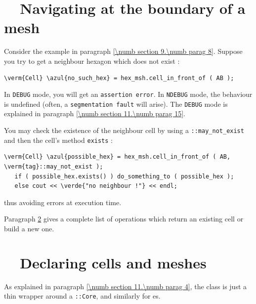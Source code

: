 \section{~~Navigating at the boundary of a mesh}\label{\numb section 9.\numb parag 9}

Consider the example in paragraph \ref{\numb section 9.\numb parag 8}.
Suppose you try to get a neighbour hexagon which does not exist :

\begin{Verbatim}[commandchars=\\\{\},formatcom=\small\tt,
   baselinestretch=0.94,framesep=2mm                      ]
   \verm{Cell} \azul{no_such_hex} = hex_msh.cell_in_front_of ( AB );
\end{Verbatim}

In {\small\tt DEBUG} mode, you will get an {\small\tt assertion error}.
In {\small\tt NDEBUG} mode, the behaviour is undefined
(often, a {\small\tt segmentation fault} will arise).
The {\small\tt DEBUG} mode is explained in paragraph \ref{\numb section 11.\numb parag 15}.

You may check the existence of the neighbour cell by using a
{\small\tt {}::may\_not\_exist} and then the cell's method {\small\tt exists} :

\begin{Verbatim}[commandchars=\\\{\},formatcom=\small\tt,
   baselinestretch=0.94,framesep=2mm                      ]
   \verm{Cell} \azul{possible_hex} = hex_msh.cell_in_front_of ( AB, \verm{tag}::may_not_exist );
   if ( possible_hex.exists() ) do_something_to ( possible_hex );
   else cout << \verde{"no neighbour !"} << endl;
\end{Verbatim}

\noindent thus avoiding errors at execution time.

Paragraph \ref{\numb section 9.\numb parag 10} gives a complete list of operations which return
an existing cell or build a new one.


\section{~~Declaring cells and meshes}\label{\numb section 9.\numb parag 10}

As explained in paragraph \ref{\numb section 11.\numb parag 4}, the {\small\tt {}} class
is just a thin wrapper around a {\small\tt {}::Core}, and similarly for {\small\tt {}}es.


